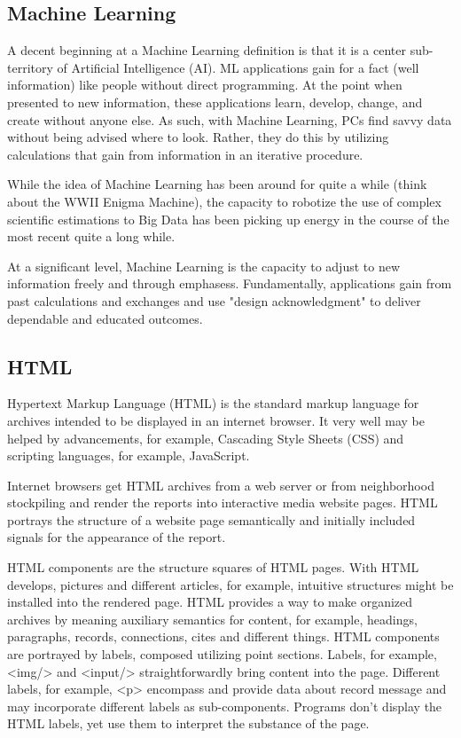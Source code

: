 \documentclass[oneside,12pt]{Classes/VTU}
\begin{document}
	\subsection{Machine Learning}
	A decent beginning at a Machine Learning definition is that it is a center sub-territory of Artificial Intelligence (AI). ML applications gain for a fact (well information) like people without direct programming. At the point when presented to new information, these applications learn, develop, change, and create without anyone else. As such, with Machine Learning, PCs find savvy data without being advised where to look. Rather, they do this by utilizing calculations that gain from information in an iterative procedure. 

While the idea of Machine Learning has been around for quite a while (think about the WWII Enigma Machine), the capacity to robotize the use of complex scientific estimations to Big Data has been picking up energy in the course of the most recent quite a long while. 

At a significant level, Machine Learning is the capacity to adjust to new information freely and through emphasess. Fundamentally, applications gain from past calculations and exchanges and use "design acknowledgment" to deliver dependable and educated outcomes.
	\subsection{HTML}
	Hypertext Markup Language (HTML) is the standard markup language for archives intended to be displayed in an internet browser. It very well may be helped by advancements, for example, Cascading Style Sheets (CSS) and scripting languages, for example, JavaScript. 

Internet browsers get HTML archives from a web server or from neighborhood stockpiling and render the reports into interactive media website pages. HTML portrays the structure of a website page semantically and initially included signals for the appearance of the report. 

HTML components are the structure squares of HTML pages. With HTML develops, pictures and different articles, for example, intuitive structures might be installed into the rendered page. HTML provides a way to make organized archives by meaning auxiliary semantics for content, for example, headings, paragraphs, records, connections, cites and different things. HTML components are portrayed by labels, composed utilizing point sections. Labels, for example, <img/> and <input/> straightforwardly bring content into the page. Different labels, for example, <p> encompass and provide data about record message and may incorporate different labels as sub-components. Programs don't display the HTML labels, yet use them to interpret the substance of the page.
\end{document}
